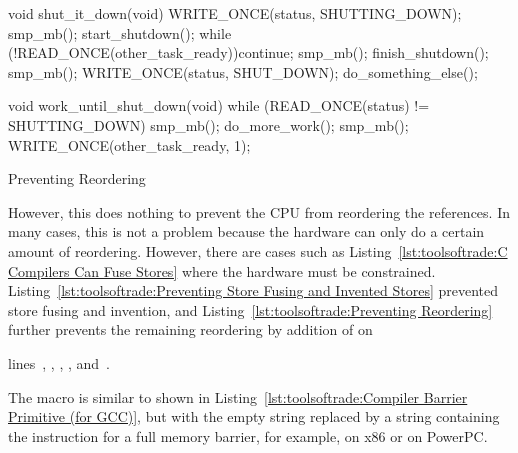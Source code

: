 \begin{listing}[tbp]
\begin{fcvlabel}
\begin{VerbatimL}[commandchars=\\\[\]]
void shut_it_down(void)
{
	WRITE_ONCE(status, SHUTTING_DOWN);
	smp_mb(); \lnlbl[mb1]
	start_shutdown();
	while (!READ_ONCE(other_task_ready))\lnlbl[loop:b]
		continue;
	smp_mb(); \lnlbl[mb2]
	finish_shutdown();
	smp_mb(); \lnlbl[mb3]
	WRITE_ONCE(status, SHUT_DOWN);
	do_something_else();
}

void work_until_shut_down(void)
{
	while (READ_ONCE(status) != SHUTTING_DOWN) {
		smp_mb(); \lnlbl[mb4]
		do_more_work();
	}
	smp_mb(); \lnlbl[mb5]
	WRITE_ONCE(other_task_ready, 1);
}
\end{VerbatimL}
\end{fcvlabel}
\caption{Preventing Reordering}
\label{lst:toolsoftrade:Preventing Reordering}
\end{listing}

However, this does nothing to prevent the CPU from reordering the
references.
In many cases, this is not a problem because the hardware can only do
a certain amount of reordering.
However, there are cases such as
Listing~\ref{lst:toolsoftrade:C Compilers Can Fuse Stores} where the
hardware must be constrained.
Listing~\ref{lst:toolsoftrade:Preventing Store Fusing and Invented Stores}
prevented store fusing and invention, and
Listing~\ref{lst:toolsoftrade:Preventing Reordering}
further prevents the remaining reordering by addition of
 on
\begin{fcvref}
lines~, , , ,
and~.
\end{fcvref}
The  macro is similar to  shown in
Listing~\ref{lst:toolsoftrade:Compiler Barrier Primitive (for GCC)},
but with the empty string replaced by a string containing the
instruction for a full memory barrier, for example, 
on x86 or  on PowerPC.

\QuickQuizEnd


